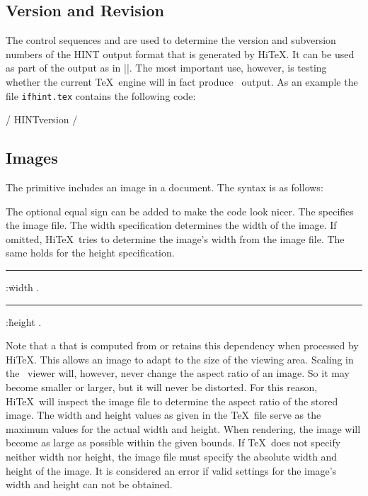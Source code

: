 \subsection{Version and Revision}
The control sequences 
and  are
used to determine the version and subversion numbers of the HINT output format
that is generated by Hi\TeX. It can be used as part of the output as 
in \verbatim|\the\HINTversion|.
The most important use, however, is testing whether the current \TeX\ engine
will in fact produce \HINT\ output.
As an example the file {\tt ifhint.tex}
contains the following code:


\verbatim/
\newif\ifhint
\expandafter\ifx\csname HINTversion\endcsname\relax
  \hintfalse\else\hinttrue\fi/


\subsection{Images}
The primitive 
includes an image in a document.
The syntax is as follows:

\medskip
{}  \opt{\.{=}} 
  
\medskip

The optional equal sign can be added to make the code look nicer.
The  specifies the image file.
The width specification determines the width of the image. If omitted,
Hi\TeX\ tries to determine the image's width from the image file.
The same holds for the height specification.

\medskip
\rule {}:\.{width} .
\rule {}:\.{height} .
\medskip

Note that a  that is computed from 
or  retains this dependency when processed by Hi\TeX.
This allows an image to adapt to the size of the viewing area.
Scaling in the \HINT\ viewer will, however, never change the
aspect ratio of an image. So it may become smaller or larger,
but it will never be distorted.
For this reason, Hi\TeX\ will inspect the image file to determine the
aspect ratio of the stored image.
The width and height values as given in the \TeX\ file serve
as the maximum values for the actual width and height. When rendering,
the image will become as large as possible within the given bounds.
If \TeX\ does not specify neither width nor height, the image file
must specify the absolute width and height of the image.
It is considered an error if valid settings for the image's width and height
can not be obtained.

